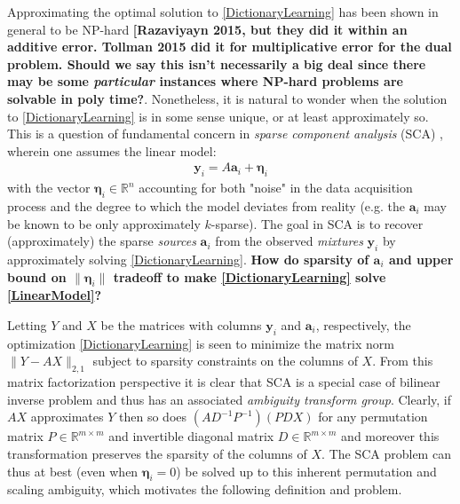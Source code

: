 \documentclass[journal, onecolumn]{IEEEtran}
\begin{document}
Approximating the optimal solution to \eqref{DictionaryLearning} has been shown in general to be NP-hard \cite{Razaviyayn} \textbf{[Razaviyayn 2015, but they did it within an additive error. Tollman 2015 did it for multiplicative error for the dual problem. Should we say this isn't necessarily a big deal since there may be some \emph{particular} instances where NP-hard problems are solvable in poly time?}. Nonetheless, it is natural to wonder when the solution to \eqref{DictionaryLearning} is in some sense unique, or at least approximately so. This is a question of fundamental concern in \emph{sparse component analysis} (SCA) \cite{Georgiev05}, wherein one assumes the linear model:
\begin{align}\label{LinearModel}
\mathbf{y}_i = A\mathbf{a}_i + \mathbf{\eta}_i 
\end{align}
%
with the vector $\mathbf{\eta}_i \in \mathbb{R}^n$ accounting for both "noise" in the data acquisition process and the degree to which the model deviates from reality (e.g. the $\mathbf{a}_i$ may be known to be only approximately $k$-sparse). The goal in SCA is to recover (approximately) the sparse \emph{sources} $\mathbf{a}_i$ from the observed \emph{mixtures} $\mathbf{y}_i$ by approximately solving \eqref{DictionaryLearning}. \textbf{How do sparsity of $\mathbf{a}_i$ and upper bound on $\|\mathbf{\eta}_i\|$ tradeoff to make \eqref{DictionaryLearning} solve \eqref{LinearModel}?}

Letting $Y$ and $X$ be the matrices with columns $\mathbf{y}_i$ and $\mathbf{a}_i$, respectively, the optimization \eqref{DictionaryLearning} is seen to minimize the matrix norm $\|Y-AX\|_{2,1}$ subject to sparsity constraints on the columns of $X$. From this matrix factorization perspective it is clear that SCA is a special case of bilinear inverse problem and thus has an associated \emph{ambiguity transform group}. Clearly, if $AX$ approximates $Y$ then so does $(AD^{-1}P^{-1})(PDX)$ for any permutation matrix $P \in \mathbb{R}^{m \times m}$ and invertible diagonal matrix $D \in \mathbb{R}^{m \times m}$ and moreover this transformation preserves the sparsity of the columns of $X$. The SCA problem can thus at best (even when $\mathbf{\eta}_i = 0$) be solved up to this inherent permutation and scaling ambiguity, which motivates the following definition and problem.
\end{document}
